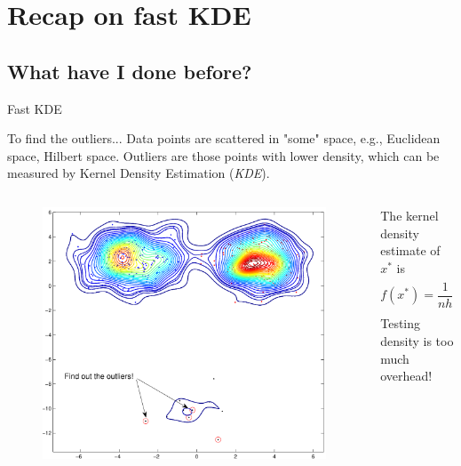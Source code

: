 \section{Recap on fast KDE}
\subsection{What have I done before?}
\begin{frame}{Fast KDE}
\begin{block}{To find the outliers...}
Data points are scattered in "some" space, e.g., Euclidean space, Hilbert space.
Outliers are those points with lower density, which can be measured by Kernel Density Estimation (\textit{KDE}).
\end{block}
\begin{columns}
\hskip10pt
\begin{column}{.35\textwidth}
\begin{figure}
\centering
\includegraphics[scale=0.25]{imgs/outliers_density}
\end{figure}
\end{column}
\begin{column}{.65\textwidth}
\begin{center}
\small
The kernel density estimate of $x^*$ is
\[
f(x^*) = \frac{1}{nh}\sum^n_{i=1}K(\frac{x^* - x_i}{h})
\]
\color{red} Testing density is too much overhead!
\end{center}	
\end{column}
\end{columns}
\end{frame}



